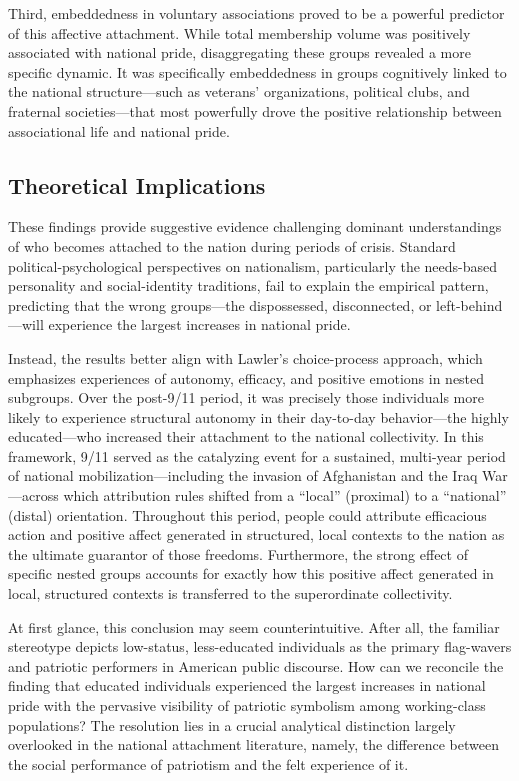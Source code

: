 \documentclass[12pt,letterpaper]{article}
\begin{document}
Third, embeddedness in voluntary associations proved to be a powerful predictor of this affective attachment. While total membership volume was positively associated with national pride, disaggregating these groups revealed a more specific dynamic. It was specifically embeddedness in groups cognitively linked to the national structure---such as veterans' organizations, political clubs, and fraternal societies---that most powerfully drove the positive relationship between associational life and national pride. 

\subsection{Theoretical Implications}
These findings provide suggestive evidence challenging dominant understandings of who becomes attached to the nation during periods of crisis. Standard political-psychological perspectives on nationalism, particularly the needs-based personality and social-identity traditions, fail to explain the empirical pattern, predicting that the wrong groups---the dispossessed, disconnected, or left-behind---will experience the largest increases in national pride. 

Instead, the results better align with Lawler's \citeyearpar{lawler1992affective-8c8} choice-process approach, which emphasizes experiences of autonomy, efficacy, and positive emotions in nested subgroups. Over the post-9/11 period, it was precisely those individuals more likely to experience structural autonomy in their day-to-day behavior---the highly educated---who increased their attachment to the national collectivity. In this framework, 9/11 served as the catalyzing event for a sustained, multi-year period of national mobilization---including the invasion of Afghanistan and the Iraq War---across which attribution rules shifted from a ``local'' (proximal) to a ``national'' (distal) orientation. Throughout this period, people could attribute efficacious action and positive affect generated in structured, local contexts to the nation as the ultimate guarantor of those freedoms. Furthermore, the strong effect of specific nested groups accounts for exactly how this positive affect generated in local, structured contexts is transferred to the superordinate collectivity.

At first glance, this conclusion may seem counterintuitive. After all, the familiar stereotype depicts low-status, less-educated individuals as the primary flag-wavers and patriotic performers in American public discourse. How can we reconcile the finding that educated individuals experienced the largest increases in national pride with the pervasive visibility of patriotic symbolism among working-class populations? The resolution lies in a crucial analytical distinction largely overlooked in the national attachment literature, namely, the difference between the social performance of patriotism and the felt experience of it.
\end{document}
